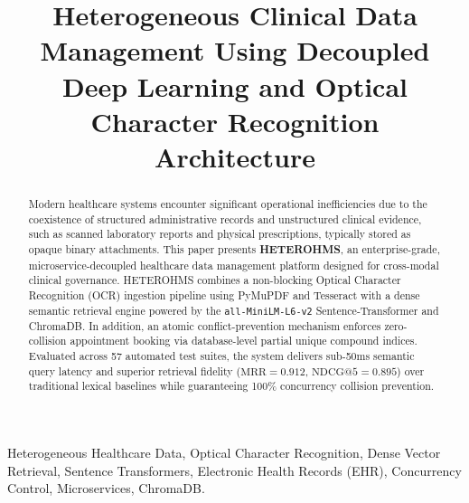 \documentclass[conference]{IEEEtran}
\begin{document}
\title{Heterogeneous Clinical Data Management Using Decoupled Deep Learning and Optical Character Recognition Architecture}

\author{
}

\maketitle

\begin{abstract}
Modern healthcare systems encounter significant operational inefficiencies due to the coexistence of structured administrative records and unstructured clinical evidence, such as scanned laboratory reports and physical prescriptions, typically stored as opaque binary attachments. This paper presents \textbf{HETEROHMS}, an enterprise-grade, microservice-decoupled healthcare data management platform designed for cross-modal clinical governance. HETEROHMS combines a non-blocking Optical Character Recognition (OCR) ingestion pipeline using PyMuPDF and Tesseract with a dense semantic retrieval engine powered by the \texttt{all-MiniLM-L6-v2} Sentence-Transformer and ChromaDB. In addition, an atomic conflict-prevention mechanism enforces zero-collision appointment booking via database-level partial unique compound indices. Evaluated across 57 automated test suites, the system delivers sub-50ms semantic query latency and superior retrieval fidelity ($\text{MRR} = 0.912$, $\text{NDCG@5} = 0.895$) over traditional lexical baselines while guaranteeing 100\% concurrency collision prevention.
\end{abstract}

\begin{IEEEkeywords}
Heterogeneous Healthcare Data, Optical Character Recognition, Dense Vector Retrieval, Sentence Transformers, Electronic Health Records (EHR), Concurrency Control, Microservices, ChromaDB.
\end{IEEEkeywords}
\end{document}
